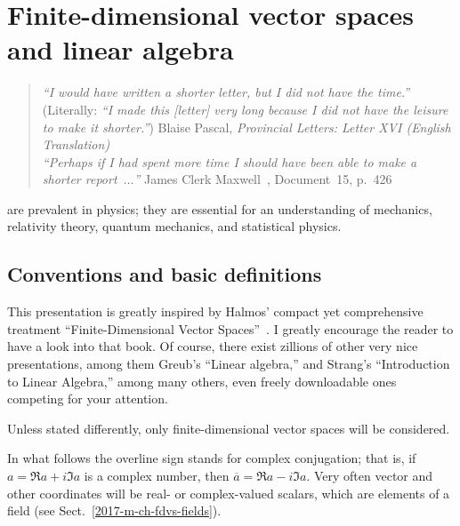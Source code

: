 \chapter{Finite-dimensional vector spaces and linear algebra}
\label{ch:lvs}

\begin{quote}
{\it ``I would have written a shorter letter, but I did not have the time.''}
(Literally: {\it ``I made this [letter] very long because I did not have the leisure to make it shorter.''})
Blaise Pascal, {\it Provincial Letters: Letter XVI (English Translation)}\\
{\it ``Perhaps if I had spent more time I should have been able to make a shorter report~$\ldots$''}
James Clerk Maxwell~\cite[-2cm]{garber}, Document~15,  p.~426
\end{quote}

 are prevalent in physics;
they are essential for an understanding
of mechanics, relativity theory, quantum mechanics, and statistical physics.

\section{Conventions and basic definitions}



This presentation is greatly inspired
by Halmos' compact yet comprehensive treatment
``Finite-Dimensional Vector Spaces''~\cite[-4cm]{halmos-vs}.
I greatly encourage the reader to have a look into that book.
Of course, there exist zillions of other very nice presentations, among them
Greub's ``Linear algebra,'' and
Strang's ``Introduction to Linear Algebra,''
among many others, even freely downloadable  ones
\cite[-3cm]{Greub75,Strang:2009:ILA,Homes-rorres,lipschutz:schaul-la,Hefferon}
competing for your attention.

Unless stated differently, only
finite-dimensional vector spaces will be considered.

In what follows
the overline sign stands for complex conjugation; that is,
if
${a}= \Re a +i\Im a $ is a complex number, then
$\overline{a}= \Re a -i\Im a$.
Very often vector and other coordinates will be real- or complex-valued scalars, which are elements of a field (see Sect.~\ref{2017-m-ch-fdvs-fields}).

